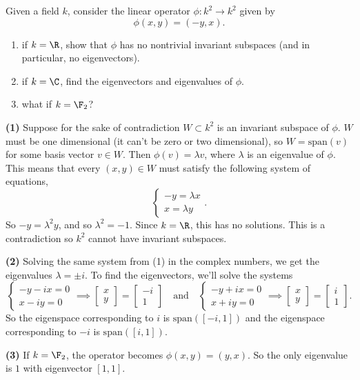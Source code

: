 \begin{problem}
Given a field $k$, consider the linear operator $\phi:k^2\to k^2$ given by \[\phi(x,y)=(-y,x).\]
\begin{enumerate}
  \item if $k=\R$, show that $\phi$ has no nontrivial invariant subspaces (and
  in particular, no eigenvectors).
  \item if $k=\C$, find the eigenvectors and eigenvalues of $\phi$.
  \item what if $k=\F_2$?
\end{enumerate}
\end{problem}
\textbf{(1)} Suppose for the sake of contradiction $W\subset k^2$ is an invariant subspace of $\phi$. $W$ must be one dimensional (it can't be zero or two dimensional), so $W=\mathrm{span}(v)$ for some basis vector $v\in W$. Then $\phi(v)=\lambda v$, where $\lambda$ is an eigenvalue of $\phi$. This means that every $(x,y)\in W$ must satisfy the following system of equations,
\[
  \begin{cases}
    -y = \lambda x\\
    x = \lambda y 
  \end{cases}
.\]    
So $-y=\lambda^2 y$, and so $\lambda^2=-1$. Since $k=\R$, this has no solutions. This is a contradiction so $k^2$ cannot have invariant subspaces.

\textbf{(2)} Solving the same system from (1) in the complex numbers, we get the eigenvalues $\lambda = \pm i$. To find the eigenvectors, we'll solve the systems
\[
  \begin{cases}
    -y-ix = 0\\
    x-iy = 0
  \end{cases}\implies \begin{bmatrix}
    x\\y
  \end{bmatrix} = \begin{bmatrix}
    -i \\ 1
  \end{bmatrix}\quad \mathrm{ and }\quad \begin{cases}
    -y+ix = 0\\
    x+iy = 0
  \end{cases}\implies \begin{bmatrix}
    x\\y
  \end{bmatrix} = \begin{bmatrix}
    i \\ 1
  \end{bmatrix}
.\]
So the eigenspace corresponding to $i$ is $\mathrm{span}\left([-i,1]\right)$ and the eigenspace corresponding to $-i$ is $\mathrm{span}\left([i,1]\right)$.   

\textbf{(3)} If $k=\F_2$, the operator becomes $\phi(x,y)=(y,x)$. So the only eigenvalue is $1$ with eigenvector $[1,1]$.    